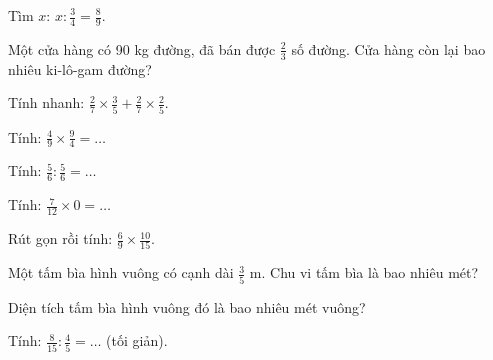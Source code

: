 \begin{ex}
Tìm $x$: $x : \frac{3}{4} = \frac{8}{9}$.
\end{ex}

\begin{ex}
Một cửa hàng có 90 kg đường, đã bán được $\frac{2}{3}$ số đường. Cửa hàng còn lại bao nhiêu ki-lô-gam đường?
\end{ex}

\begin{ex}
Tính nhanh: $\frac{2}{7} \times \frac{3}{5} + \frac{2}{7} \times \frac{2}{5}$.
\end{ex}

\begin{ex}
Tính: $\frac{4}{9} \times \frac{9}{4} = \dots$
\end{ex}

\begin{ex}
Tính: $\frac{5}{6} : \frac{5}{6} = \dots$
\end{ex}

\begin{ex}
Tính: $\frac{7}{12} \times 0 = \dots$
\end{ex}

\begin{ex}
Rút gọn rồi tính: $\frac{6}{9} \times \frac{10}{15}$.
\end{ex}

\begin{ex}
Một tấm bìa hình vuông có cạnh dài $\frac{3}{5}$ m. Chu vi tấm bìa là bao nhiêu mét?
\end{ex}

\begin{ex}
Diện tích tấm bìa hình vuông đó là bao nhiêu mét vuông?
\end{ex}

\begin{ex}
Tính: $\frac{8}{15} : \frac{4}{5} = \dots$ (tối giản).
\end{ex}

